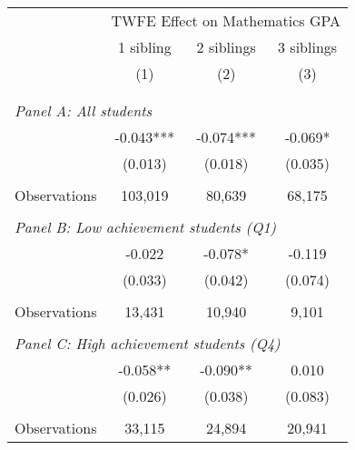 \makeatletter
{}
{
\makeatother
\begin{tabular}{lccc}
\toprule
\cmidrule(lr){2-4}
& \multicolumn{3}{c}{TWFE Effect on Mathematics GPA} \\
\cmidrule(lr){2-4}
& 1 sibling & 2 siblings & 3 siblings  \\
\cmidrule(lr){2-2} \cmidrule(lr){3-3} \cmidrule(lr){4-4}
& (1) & (2) & (3)\\
\bottomrule
&  &  &  \\
&  &  &   \\
\multicolumn{4}{l}{\textit{Panel A: All students}} \\
\hspace{3mm}        &      -0.043***&      -0.074***&      -0.069*  \\
                    &     (0.013)   &     (0.018)   &     (0.035)   \\
                    &               &               &               \\
\hspace{3mm}Observations&     103,019   &      80,639   &      68,175   \\
 
&  &  &   \\
\multicolumn{4}{l}{\textit{Panel B: Low achievement students (Q1)}} \\
\hspace{3mm}        &      -0.022   &      -0.078*  &      -0.119   \\
                    &     (0.033)   &     (0.042)   &     (0.074)   \\
                    &               &               &               \\
\hspace{3mm}Observations&      13,431   &      10,940   &       9,101   \\
 
&  &  &   \\
\multicolumn{4}{l}{\textit{Panel C: High achievement students (Q4)}} \\
\hspace{3mm}        &      -0.058** &      -0.090** &       0.010   \\
                    &     (0.026)   &     (0.038)   &     (0.083)   \\
                    &               &               &               \\
\hspace{3mm}Observations&      33,115   &      24,894   &      20,941   \\
 

\end{tabular}}
